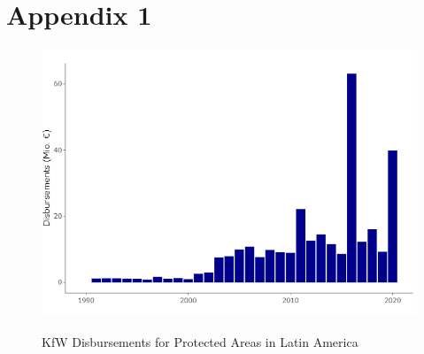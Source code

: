 \documentclass{article}
\begin{document}
\newpage
\section*{Appendix 1}
\begin{figure}[H]
\centering
\caption{KfW Disbursements for Protected Areas in Latin America}
\includegraphics[width=0.8\linewidth]{"figures/disbursements_kfw"}
\label{fig:disbursements}
\end{figure}

\newpage
\end{document}
